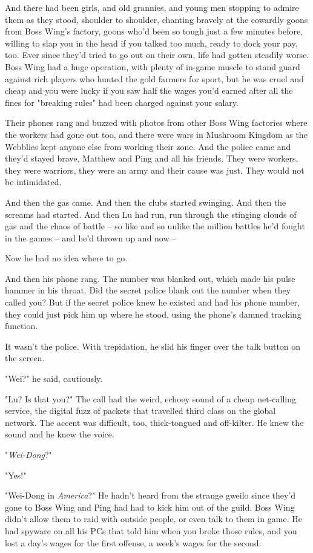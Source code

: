 And there had been girls, and old grannies, and young men stopping
to admire them as they stood, shoulder to shoulder, chanting
bravely at the cowardly goons from Boss Wing's factory, goons who'd
been so tough just a few minutes before, willing to slap you in the
head if you talked too much, ready to dock your pay, too. Ever
since they'd tried to go out on their own, life had gotten steadily
worse. Boss Wing had a huge operation, with plenty of in-game
muscle to stand guard against rich players who hunted the gold
farmers for sport, but he was cruel and cheap and you were lucky if
you saw half the wages you'd earned after all the fines for
"breaking rules" had been charged against your salary.

Their phones rang and buzzed with photos from other Boss Wing
factories where the workers had gone out too, and there were wars
in Mushroom Kingdom as the Webblies kept anyone else from working
their zone. And the police came and they'd stayed brave, Matthew
and Ping and all his friends. They were workers, they were
warriors, they were an army and their cause was just. They would
not be intimidated.

And then the gas came. And then the clubs started swinging. And
then the screams had started. And then Lu had run, run through the
stinging clouds of gas and the chaos of battle -- so like and so
unlike the million battles he'd fought in the games -- and he'd
thrown up and now --

Now he had no idea where to go.

And then his phone rang. The number was blanked out, which made his
pulse hammer in his throat. Did the secret police blank out the
number when they called you? But if the secret police knew he
existed and had his phone number, they could just pick him up where
he stood, using the phone's damned tracking function.

It wasn't the police. With trepidation, he slid his finger over the
talk button on the screen.

"Wei?" he said, cautiously.

"Lu? Is that you?" The call had the weird, echoey sound of a cheap
net-calling service, the digital fuzz of packets that travelled
third class on the global network. The accent was difficult, too,
thick-tongued and off-kilter. He knew the sound and he knew the
voice.

"\emph{Wei-Dong}?"

"Yes!"

"Wei-Dong in \emph{America}?" He hadn't heard from the strange
gweilo since they'd gone to Boss Wing and Ping had had to kick him
out of the guild. Boss Wing didn't allow them to raid with outside
people, or even talk to them in game. He had spyware on all his PCs
that told him when you broke those rules, and you lost a day's
wages for the first offense, a week's wages for the second.

